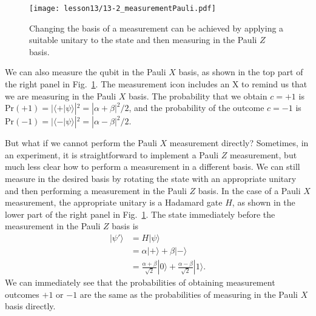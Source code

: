 \begin{figure}[t]
    \centering
    \texttt{[image: lesson13/13-2\_measurementPauli.pdf]}
    \caption[Changing the basis of measurements.]{Changing the basis of a measurement can be achieved by applying a suitable unitary to the state and then measuring in the Pauli $Z$ basis.}
    \label{fig:13-2_measurementPauli}
\end{figure}

We can also measure the qubit in the Pauli $X$ basis, as shown in the top part of the right panel in Fig.~\ref{fig:13-2_measurementPauli}.
The measurement icon includes an X to remind us that we are measuring in the Pauli $X$ basis.
The probability that we obtain $c=+1$ is $\text{Pr}(+1)=|\langle+|\psi\rangle|^2=|\alpha+\beta|^2/2$, and the probability of the outcome $c=-1$ is $\text{Pr}(-1)=|\langle-|\psi\rangle|^2=|\alpha-\beta|^2/2$.

But what if we cannot perform the Pauli $X$ measurement directly?
Sometimes, in an experiment, it is straightforward to implement a Pauli $Z$ measurement, but much less clear how to perform a measurement in a different basis.
We can still measure in the desired basis by rotating the state with an appropriate unitary and then performing a measurement in the Pauli $Z$ basis.
In the case of a Pauli $X$ measurement, the appropriate unitary is a Hadamard gate $H$, as shown in the lower part of the right panel in Fig.~\ref{fig:13-2_measurementPauli}.
The state immediately before the measurement in the Pauli $Z$ basis is
\begin{align}
    |\psi'\rangle & = H|\psi\rangle \nonumber\\
    & = \alpha |+\rangle + \beta |-\rangle \nonumber\\
    & = \frac{\alpha + \beta}{\sqrt{2}} |0\rangle + \frac{\alpha - \beta}{\sqrt{2}} |1\rangle.
\end{align}
We can immediately see that the probabilities of obtaining measurement outcomes $+1$ or $-1$ are the same as the probabilities of measuring in the Pauli $X$ basis directly.

